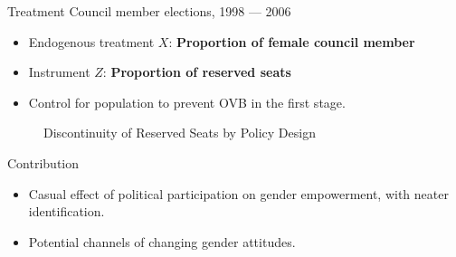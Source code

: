 \documentclass[
  10pt,
  ignorenonframetext,
  aspectratio=43,
]{beamer}
\providecommand{\tightlist}{%
  \setlength{\itemsep}{0pt}\setlength{\parskip}{0pt}}
\begin{document}
\begin{frame}
\begin{block}{Treatment}
\protect\hypertarget{treatment}{}
Council member elections, 1998 --- 2006

\begin{itemize}
\tightlist
\item
  Endogenous treatment \(X\): \textbf{Proportion of female council
  member}
\item
  Instrument \(Z\): \textbf{Proportion of reserved seats}
\item
  Control for population to prevent OVB in the first stage.
\end{itemize}

\begin{figure}[htb]
\centering
{}
\caption{Discontinuity of Reserved Seats by Policy Design}
\end{figure}
\end{block}
\end{frame}

\begin{frame}{Contribution}
\protect\hypertarget{contribution}{}
\begin{itemize}
\tightlist
\item
  Casual effect of political participation on gender empowerment, with
  neater identification.
\item
  Potential channels of changing gender attitudes.
\end{itemize}
\end{frame}
\end{document}
